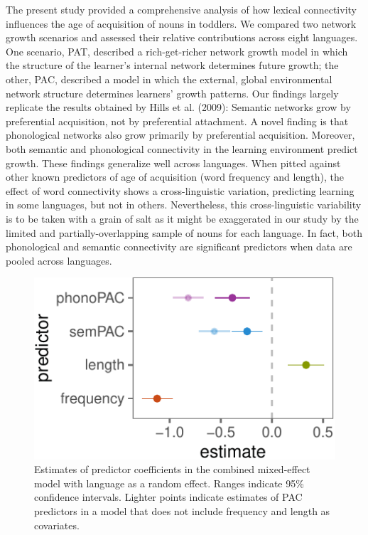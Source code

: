 \documentclass[10pt, letterpaper]{article}
\newenvironment{CodeChunk}{}{}
\begin{document}
The present study provided a comprehensive analysis of how lexical
connectivity influences the age of acquisition of nouns in toddlers. We
compared two network growth scenarios and assessed their relative
contributions across eight languages. One scenario, PAT, described a
rich-get-richer network growth model in which the structure of the
learner's internal network determines future growth; the other, PAC,
described a model in which the external, global environmental network
structure determines learners' growth patterns. Our findings largely
replicate the results obtained by Hills et al. (2009): Semantic networks
grow by preferential acquisition, not by preferential attachment. A
novel finding is that phonological networks also grow primarily by
preferential acquisition. Moreover, both semantic and phonological
connectivity in the learning environment predict growth. These findings
generalize well across languages. When pitted against other known
predictors of age of acquisition (word frequency and length), the effect
of word connectivity shows a cross-linguistic variation, predicting
learning in some languages, but not in others. Nevertheless, this
cross-linguistic variability is to be taken with a grain of salt as it
might be exaggerated in our study by the limited and
partially-overlapping sample of nouns for each language. In fact, both
phonological and semantic connectivity are significant predictors when
data are pooled across languages.

\begin{CodeChunk}
\begin{figure}[H]

{\centering \includegraphics{figs/regressions_all_img-1} 

}

\caption{\label{fig:regressions_all_img}Estimates of predictor coefficients in the combined mixed-effect model with language as a random effect. Ranges indicate 95\% confidence intervals. Lighter points indicate estimates of PAC predictors in a model that does not include frequency and length as covariates.}\label{fig:regressions_all_img}
\end{figure}
\end{CodeChunk}
\end{document}
